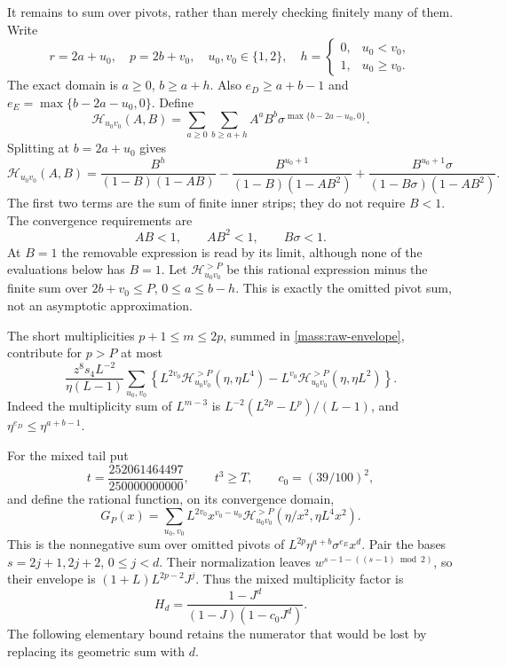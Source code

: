 \documentclass[11pt]{amsart}
\theoremstyle{definition}
\theoremstyle{remark}
\numberwithin{equation}{section}
\begin{document}
It remains to sum over pivots, rather than merely checking finitely
many of them. Write
\[
 r=2a+u_0,\quad p=2b+v_0,\quad u_0,v_0\in\{1,2\},\quad
 h=\begin{cases}0,&u_0<v_0,\\1,&u_0\ge v_0.\end{cases}
\]
The exact domain is $a\ge0$, $b\ge a+h$. Also
$e_D\ge a+b-1$ and $e_E=\max\{b-2a-u_0,0\}$. Define
\[
 \mathcal H_{u_0v_0}(A,B)
 =\sum_{a\ge0}\sum_{b\ge a+h}A^aB^b
      \sigma^{\max\{b-2a-u_0,0\}}.
\]
Splitting at $b=2a+u_0$ gives
\begin{equation}\label{mass:parity-sum}
 \mathcal H_{u_0v_0}(A,B)=
 \frac{B^h}{(1-B)(1-AB)}
 -\frac{B^{u_0+1}}{(1-B)(1-AB^2)}
 +\frac{B^{u_0+1}\sigma}{(1-B\sigma)(1-AB^2)}.
\end{equation}
The first two terms are the sum of finite inner strips; they do not
require $B<1$. The convergence requirements are
\begin{equation}\label{mass:convergence}
 AB<1,\qquad AB^2<1,\qquad B\sigma<1.
\end{equation}
At $B=1$ the removable expression is read by its limit, although none
of the evaluations below has $B=1$. Let
$\mathcal H^{>P}_{u_0v_0}$ be this rational expression minus the finite
sum over $2b+v_0\le P$, $0\le a\le b-h$. This is exactly the omitted
pivot sum, not an asymptotic approximation.

The short multiplicities $p+1\le m\le2p$, summed in
\eqref{mass:raw-envelope}, contribute for $p>P$ at most
\begin{equation}\label{mass:short}
 \frac{z^8s_4L^{-2}}{\eta(L-1)}
 \sum_{u_0,v_0}\left\{
 L^{2v_0}\mathcal H^{>P}_{u_0v_0}(\eta,\eta L^4)
 -L^{v_0}\mathcal H^{>P}_{u_0v_0}(\eta,\eta L^2)\right\}.
\end{equation}
Indeed the multiplicity sum of $L^{m-3}$ is
$L^{-2}(L^{2p}-L^p)/(L-1)$, and $\eta^{e_D}\le\eta^{a+b-1}$.

For the mixed tail put
\[
 t=\frac{252061464497}{250000000000},\qquad t^3\ge T,
 \qquad c_0=(39/100)^2,
\]
and define the rational function, on its convergence domain,
\begin{equation}\label{mass:G}
 G_P(x)=\sum_{u_0,v_0}L^{2v_0}x^{v_0-u_0}
 \mathcal H^{>P}_{u_0v_0}
       (\eta/x^2,\eta L^4x^2).
\end{equation}
This is the nonnegative sum over omitted pivots of
$L^{2p}\eta^{a+b}\sigma^{e_E}x^d$.
Pair the bases $s=2j+1,2j+2$, $0\le j<d$. Their normalization leaves
$w^{s-1-((s-1)\bmod2)}$, so their envelope is
$(1+L)L^{2p-2}J^j$. Thus the mixed multiplicity factor is
\[
 H_d=\frac{1-J^d}{(1-J)(1-c_0J^d)}.
\]
The following elementary bound retains the numerator that would be
lost by replacing its geometric sum with $d$.
\end{document}
